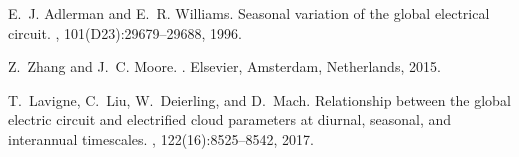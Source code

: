 \documentclass[12pt, russian, a4paper]{article}
\begin{document}
\begin{thebibliography}{10}
E.~J. Adlerman and E.~R. Williams.
\newblock Seasonal variation of the global electrical circuit.
, 101(D23):29679--29688, 1996.

Z.~Zhang and J.~C. Moore.
.
\newblock Elsevier, Amsterdam, Netherlands, 2015.

T.~Lavigne, C.~Liu, W.~Deierling, and D.~Mach.
\newblock Relationship between the global electric circuit and electrified
  cloud parameters at diurnal, seasonal, and interannual timescales.
, 122(16):8525--8542, 2017.

\end{thebibliography}
\end{document}
